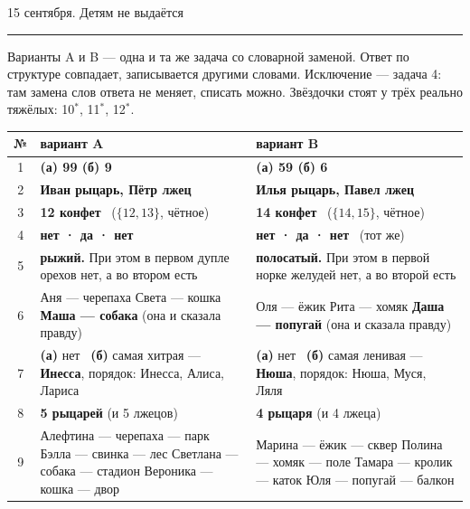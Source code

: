 \documentclass[10pt,a4paper]{article}
\begin{document}
\hfill{\small 15 сентября. Детям не выдаётся}
\vspace{4pt}\hrule\vspace{8pt}

{\small Варианты A и B --- одна и та же задача со словарной заменой. Ответ по структуре
совпадает, записывается другими словами. Исключение --- задача 4: там замена слов ответа
не меняет, списать можно. Звёздочки стоят у трёх реально тяжёлых: 10$^*$, 11$^*$, 12$^*$.}

\vspace{6pt}

\begin{tabular}{@{}c|p{8.1cm}|p{8.1cm}@{}}
\textbf{№} & \hfil\textbf{вариант A}\hfil & \hfil\textbf{вариант B}\hfil\\ \hline
1 & \textbf{(а) 99 \quad (б) 9} & \textbf{(а) 59 \quad (б) 6}\\ \hline
2 & \textbf{Иван рыцарь, Пётр лжец} & \textbf{Илья рыцарь, Павел лжец}\\ \hline
3 & \textbf{12 конфет} \ ($\{12,13\}$, чётное) & \textbf{14 конфет} \ ($\{14,15\}$, чётное)\\ \hline
4 & \textbf{нет · да · нет} & \textbf{нет · да · нет} \ (тот же)\\ \hline
5 & \textbf{рыжий.} При этом в первом дупле орехов нет, а во втором есть & \textbf{полосатый.} При этом в первой норке желудей нет, а во второй есть\\ \hline
6 & Аня --- черепаха \newline Света --- кошка \newline \textbf{Маша --- собака} (она и сказала правду) & Оля --- ёжик \newline Рита --- хомяк \newline \textbf{Даша --- попугай} (она и сказала правду)\\ \hline
7 & \textbf{(а)} нет \ \textbf{(б)} самая хитрая --- \textbf{Инесса}, \newline порядок: Инесса, Алиса, Лариса & \textbf{(а)} нет \ \textbf{(б)} самая ленивая --- \textbf{Нюша}, \newline порядок: Нюша, Муся, Ляля\\ \hline
8 & \textbf{5 рыцарей} (и 5 лжецов) & \textbf{4 рыцаря} (и 4 лжеца)\\ \hline
9 & Алефтина --- черепаха --- парк \newline Бэлла --- свинка --- лес \newline Светлана --- собака --- стадион \newline Вероника --- кошка --- двор & Марина --- ёжик --- сквер \newline Полина --- хомяк --- поле \newline Тамара --- кролик --- каток \newline Юля --- попугай --- балкон\\ \hline

\end{tabular}
\end{document}
